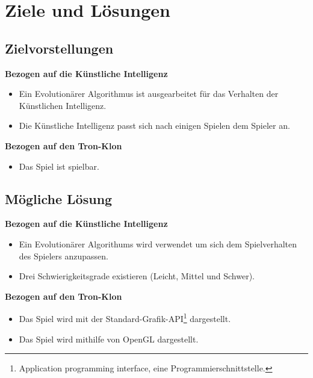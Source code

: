 \section{Ziele und Lösungen}
\subsection{Zielvorstellungen}
\textbf{Bezogen auf die Künstliche Intelligenz}
\begin{itemize}
	\item Ein Evolutionärer Algorithmus ist ausgearbeitet für das Verhalten der Künstlichen Intelligenz.
	\item Die Künstliche Intelligenz passt sich nach einigen Spielen dem Spieler an.
\end{itemize}
\textbf{Bezogen auf den Tron-Klon}
\begin{itemize}
	\item Das Spiel ist spielbar.
\end{itemize}
\subsection{Mögliche Lösung}
\textbf{Bezogen auf die Künstliche Intelligenz}
\begin{itemize}
	\item Ein Evolutionärer Algorithums wird verwendet um sich dem Spielverhalten des Spielers anzupassen.
	\item Drei Schwierigkeitsgrade existieren (Leicht, Mittel und Schwer).
\end{itemize}
\textbf{Bezogen auf den Tron-Klon}
\begin{itemize}
	\item Das Spiel wird mit der Standard-Grafik-API\footnote{Application programming interface, eine Programmierschnittstelle.} dargestellt.
	\item Das Spiel wird mithilfe von OpenGL dargestellt.
\end{itemize}